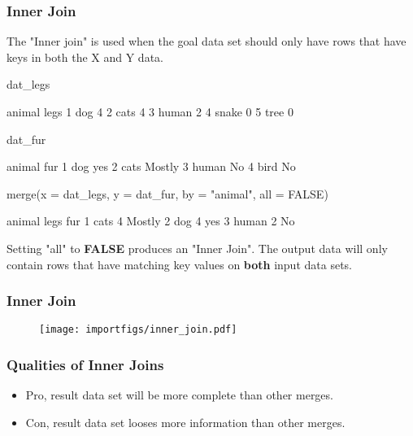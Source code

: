 \documentclass[10pt,american]{beamer}
\renewenvironment{Schunk}{}{}
\renewenvironment{Sinput}{}{}
\begin{document}
\begin{frame}
\frametitle{Inner Join}

The "Inner join" is used when the goal data set should only have
rows that have keys in both the X and Y data.

\begin{Schunk}
\begin{Sinput}
 dat_legs
\end{Sinput}
\begin{Soutput}
  animal legs
1    dog    4
2   cats    4
3  human    2
4  snake    0
5   tree    0
\end{Soutput}
\begin{Sinput}
 dat_fur
\end{Sinput}
\begin{Soutput}
  animal    fur
1    dog    yes
2   cats Mostly
3  human     No
4   bird     No
\end{Soutput}
\begin{Sinput}
 merge(x = dat_legs, y = dat_fur, by = "animal", all = FALSE)
\end{Sinput}
\begin{Soutput}
  animal legs    fur
1   cats    4 Mostly
2    dog    4    yes
3  human    2     No
\end{Soutput}
\end{Schunk}

Setting "all" to \textbf{FALSE} produces an "Inner Join". The output
data will only contain rows that have matching key values on
\textbf{both} input data sets.
\end{frame}


\begin{frame}[containsverbatim]
\frametitle{Inner Join}
\begin{figure}
\texttt{[image: importfigs/inner\_join.pdf]}
\end{figure}
\end{frame}

\begin{frame}
\frametitle{Qualities of Inner Joins}
\begin{itemize}
\item Pro, result data set will be more complete than other merges. 
\item Con, result data set looses more information than other merges.
\end{itemize}
\end{frame}
\end{document}
